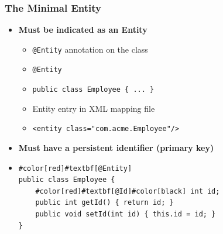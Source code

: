 \documentclass[10pt,xcolor=pdflatex]{beamer}
\begin{document}
\begin{frame}[fragile]\frametitle{The Minimal Entity}
    \begin{itemize}
		\item \textbf{Must be indicated as an Entity}
          \begin{itemize}
            \item \texttt{@Entity} annotation on the class
            \item[] \color{red}\verb'@Entity'\color{black}
            \item[] \verb'public class Employee { ... }'\\[.2cm]
            \item  Entity entry in XML mapping file
            \item[] \verb'<entity class="com.acme.Employee"/>'\\[0.2cm]
          \end{itemize}
        \item \textbf{Must have a persistent identifier (primary key)}
		\item[] \begin{Verbatim}[fontsize=\footnotesize, commandchars=\#\[\]]
#color[red]#textbf[@Entity]
public class Employee {
    #color[red]#textbf[@Id]#color[black] int id;
    public int getId() { return id; }
    public void setId(int id) { this.id = id; }
}
			\end{Verbatim}
	\end{itemize}
\end{frame}
\end{document}
